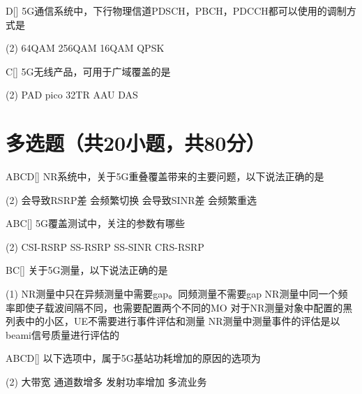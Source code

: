 \begin{choice}{D}[]
    5G通信系统中，下行物理信道PDSCH，PBCH，PDCCH都可以使用的调制方式是
    \begin{tasks}(2)
        \task 64QAM
        \task 256QAM
        \task 16QAM
        \task QPSK
    \end{tasks}
\end{choice}


\begin{choice}{C}[]
    5G无线产品，可用于广域覆盖的是
    \begin{tasks}(2)
        \task PAD
        \task pico
        \task 32TR AAU
        \task DAS
    \end{tasks}
\end{choice}

\section{多选题（共20小题，共80分）}

\begin{choice}{\;ABCD\;}[]
    NR系统中，关于5G重叠覆盖带来的主要问题，以下说法正确的是
    \begin{tasks}(2)
        \task 会导致RSRP差
        \task 会频繁切换
        \task 会导致SINR差
        \task 会频繁重选
    \end{tasks}
\end{choice}

\begin{choice}{\;ABC\;}[]
    5G覆盖测试中，关注的参数有哪些
    \begin{tasks}(2)
        \task CSI-RSRP
        \task SS-RSRP
        \task SS-SINR
        \task CRS-RSRP
    \end{tasks}
\end{choice}

\begin{choice}{\;BC\;}[]
    关于5G测量，以下说法正确的是
    \begin{tasks}(1)
        \task NR测量中只在异频测量中需要gap。同频测量不需要gap
        \task NR测量中同一个频率即使子载波间隔不同，也需要配置两个不同的MO
        \task 对于NR测量对象中配置的黑列表中的小区，UE不需要进行事件评估和测量
        \task NR测量中测量事件的评估是以beami信号质量进行评估的
    \end{tasks}
\end{choice}

\begin{choice}{\;ABCD\;}[]
    以下选项中，属于5G基站功耗增加的原因的选项为
    \begin{tasks}(2)
        \task 大带宽
        \task 通道数增多
        \task 发射功率增加
        \task 多流业务
    \end{tasks}
\end{choice}


